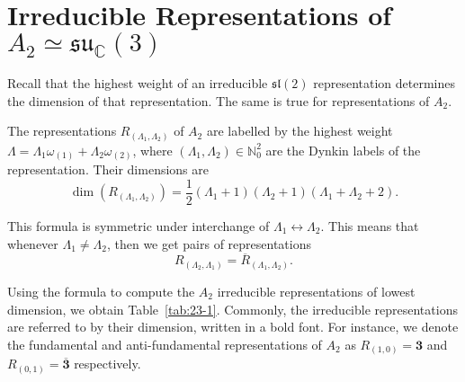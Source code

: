 
\section{Irreducible Representations of \texorpdfstring{$A_2 \simeq \mathfrak{su}_{\mathbb{C}}(3)$}{the Complexified Lie Algebra of SU(3)}}%
\label{sec:irreducible representations_of_lie_algebra_of_su_3_}

Recall that the highest weight of an irreducible $\mathfrak{sl}(2)$ representation determines the dimension of that representation. The same is true for representations of $A_2$.
\begin{claim}
  The representations $R_{(\Lambda_1, \Lambda_2)}$ of $A_2$ are labelled by the highest weight $\Lambda = \Lambda_1 \omega_{(1)} + \Lambda_2 \omega_{(2)}$, where $(\Lambda_1, \Lambda_2) \in \mathbb{N}_0^2$ are the Dynkin labels of the representation. Their dimensions are
  \begin{equation}
    \dim(R_{(\Lambda_1, \Lambda_2)}) = \frac{1}{2} (\Lambda_1 + 1) (\Lambda_2 + 1) (\Lambda_1 + \Lambda_2 + 2).
  \end{equation}
\end{claim}
\begin{corollary}
  This formula is symmetric under interchange of $\Lambda_1 \leftrightarrow \Lambda_2$.  This means that whenever $\Lambda_1 \neq \Lambda_2$, then we get pairs of representations
  \begin{equation}
    R_{(\Lambda_2, \Lambda_1)} = \overline{R}_{(\Lambda_1, \Lambda_2)}.
  \end{equation}
\end{corollary}
Using the formula to compute the $A_2$ irreducible representations of lowest dimension, we obtain Table~\ref{tab:23-1}. Commonly, the irreducible representations are referred to by their dimension, written in a bold font. For instance, we denote the fundamental and anti-fundamental representations of $A_2$ as $R_{(1, 0)} = \boldsymbol 3$ and $R_{(0,1)} = \overline{\boldsymbol 3}{}$ respectively.

